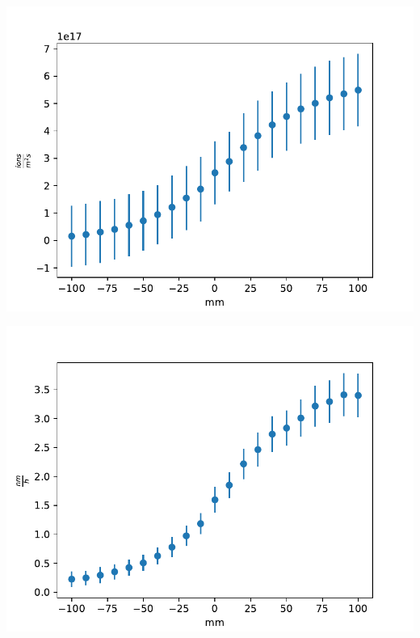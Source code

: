 \documentclass{beamer} %
\begin{document}
\begin{frame}
\begin{minipage}{0.49\textwidth}
        \includegraphics[width=1.1\textwidth]{figures/PosVary_H2_2A_flux_werrors.pdf}
    \end{minipage}
    \begin{minipage}{0.49\textwidth}
        \includegraphics[width=1.1\textwidth]{figures/PosVary_H2_2A_worstcaseput_werrors.pdf}
    \end{minipage}
\end{frame}
\end{document}
